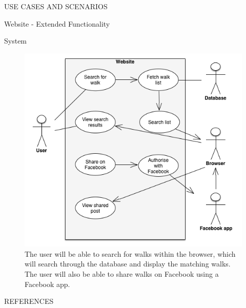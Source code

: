 \documentclass{article}
\begin{document}
\begin{section}{USE CASES AND SCENARIOS}
		\clearpage
		\begin{subsection}{Website - Extended Functionality}
			\begin{subsubsection}{System}
				\begin{figure}[h!]
					\begin{center}
						\includegraphics[height=0.75\columnwidth]{images/UseCase/Website/Extended/Website.png}
					\end{center}
					\caption{The user will be able to search for walks within the browser, which will search through the database and display the matching walks. The user will also be able to share walks on Facebook using a Facebook app.}
				\end{figure}
			\end{subsubsection}
		\end{subsection}
	\end{section}

	\nocite{LaTeXTemplate}

	\newpage
	\begin{section}{REFERENCES}
		
		
	\end{section}
\end{document}
